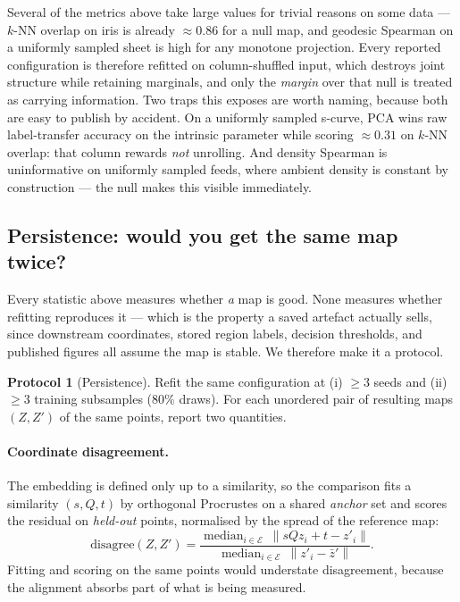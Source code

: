 \documentclass[12pt]{iopart}
\theoremstyle{definition}
\newtheorem{protocolx}{Protocol}
\theoremstyle{plain}
\theoremstyle{remark}
\newcommand{\norm}[1]{\left\lVert#1\right\rVert}
\DeclareMathOperator{\med}{median}
\begin{document}
Several of the metrics above take large values for trivial reasons on some
data --- $k$-NN overlap on iris is already $\approx0.86$ for a null map, and
geodesic Spearman on a uniformly sampled sheet is high for any monotone
projection. Every reported configuration is therefore refitted on
column-shuffled input, which destroys joint structure while retaining marginals,
and only the \emph{margin} over that null is treated as carrying information.
Two traps this exposes are worth naming, because both are easy to publish by
accident. On a uniformly sampled s-curve, PCA wins raw label-transfer accuracy
on the intrinsic parameter while scoring $\approx0.31$ on $k$-NN overlap: that
column rewards \emph{not} unrolling. And density Spearman is uninformative on
uniformly sampled feeds, where ambient density is constant by construction ---
the null makes this visible immediately.

\subsection{Persistence: would you get the same map twice?}
\label{sec:persistence}

Every statistic above measures whether \emph{a} map is good. None measures
whether refitting reproduces it --- which is the property a saved artefact
actually sells, since downstream coordinates, stored region labels, decision
thresholds, and published figures all assume the map is stable. We therefore
make it a protocol.

\begin{protocolx}[Persistence]
\label{prot:persistence}
Refit the same configuration at (i) $\ge3$ seeds and (ii) $\ge3$ training
subsamples ($80\%$ draws). For each unordered pair of resulting maps $(Z,Z')$
of the same points, report two quantities.
\end{protocolx}

\paragraph{Coordinate disagreement.}
The embedding is defined only up to a similarity, so the comparison fits a
similarity $(s,Q,t)$ by orthogonal Procrustes on a shared \emph{anchor} set and
scores the residual on \emph{held-out} points, normalised by the spread of the
reference map:
\begin{equation}
\label{eq:procdis}
\mathrm{disagree}(Z,Z')
=
\frac{\med_{i\in\mathcal{E}}\ \norm{sQz_i+t-z'_i}}
     {\med_{i\in\mathcal{E}}\ \norm{z'_i-\bar z'}} .
\end{equation}
Fitting and scoring on the same points would understate disagreement, because
the alignment absorbs part of what is being measured.
\end{document}
